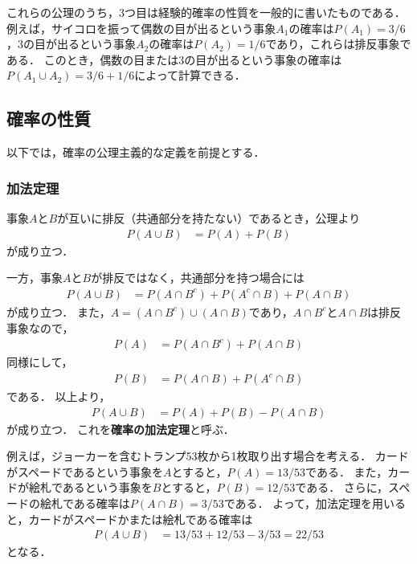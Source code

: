 %
これらの公理のうち，3つ目は経験的確率の性質を一般的に書いたものである．
%
例えば，サイコロを振って偶数の目が出るという事象$ A_{1} $の確率は$ P(A_{1})=3/6 $，3の目が出るという事象$ A_{2} $の確率は$ P(A_{2})=1/6 $であり，これらは排反事象である．
%
このとき，偶数の目または3の目が出るという事象の確率は$ P(A_{1} \cup A_{2})=3/6 + 1/6 $によって計算できる．
%

\subsection{確率の性質}
%
以下では，確率の公理主義的な定義を前提とする．

\subsubsection*{加法定理}
%
事象$ A $と$ B $が互いに排反（共通部分を持たない）であるとき，公理より
%
\begin{align*}
	P(A \cup B) &= P(A) + P(B)
\end{align*}
%
が成り立つ．
%

%
一方，事象$ A $と$ B $が排反ではなく，共通部分を持つ場合には
%
\begin{align*}
	P(A \cup B) &= P(A\cap B^{c}) + P(A^{c}\cap B) + P(A\cap B)
\end{align*}
%
が成り立つ．
%
また，$ A = (A\cap B^{c}) \cup (A\cap B) $であり，$ A\cap B^{c} $と$ A\cap B $は排反事象なので，
%
\begin{align*}
	P(A) &= P(A\cap B^{c}) + P(A\cap B)
\end{align*}
%
同様にして，
%
\begin{align*}
	P(B) &= P(A\cap B) + P(A^{c}\cap B)
\end{align*}
%
である．
%
以上より，
%
\begin{align*}
	P(A\cup B) &=  P(A) + P(B) - P(A \cap B)
\end{align*}
%
が成り立つ．
%
これを\textbf{確率の加法定理}と呼ぶ．
%

%
例えば，ジョーカーを含むトランプ53枚から1枚取り出す場合を考える．
%
カードがスペードであるという事象を$ A $とすると，$ P(A)=13/53 $である．
%
また，カードが絵札であるという事象を$ B $とすると，$ P(B)=12/53 $である．
%
さらに，スペードの絵札である確率は$ P(A\cap B)=3/53 $である．
%
よって，加法定理を用いると，カードがスペードかまたは絵札である確率は
%
\begin{align*}
	P(A\cup B) &= 13/53+12/53-3/53=22/53
\end{align*}
%
となる．
%


